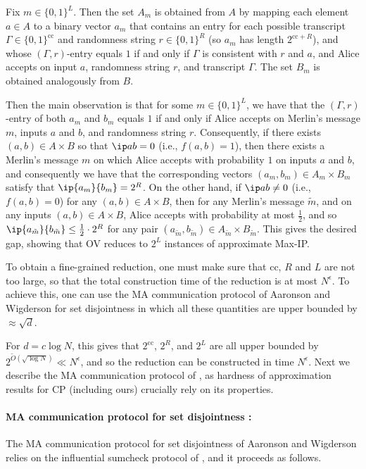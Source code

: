 \documentclass[11pt]{article}
\theoremstyle{plain}
\theoremstyle{remark}
\newcommand{\cc}{\mathrm{cc}}
\begin{document}
Fix $m \in \{0,1\}^L$. Then the set $A_m$ is obtained from $A$ by mapping each element $a \in A$  to a binary vector $a_m$ that contains an entry for each possible transcript $\Gamma \in \{0,1\}^{\cc}$ and randomness string $r \in \{0,1\}^R$ (so $a_m$ has length $2^{\cc+R}$), and whose $(\Gamma, r)$-entry equals $1$ if and only if $\Gamma$ is consistent with $r$ and $a$, and Alice accepts on input $a$, randomness string $r$, and transcript $\Gamma$.
The set $B_m$ is obtained analogously from $B$. 

Then the main observation is that for some $m \in \{0,1\}^L$, we have that the $(\Gamma,r)$-entry of both $a_m$ and $b_m$ equals $1$ if and only if Alice accepts on Merlin's message $m$, inputs $a$ and $b$, and randomness string $r$. Consequently, if there exists $(a,b) \in A \times B$ so that $\ip a b =0$ (i.e., $f(a,b)=1$), then there exists a Merlin's message $m$ on which Alice accepts with probability $1$ on inputs $a$ and $b$, and consequently we have that the corresponding vectors
$(a_m,b_m) \in A_m \times B_m$ satisfy that $\ip {a_m} {b_m} = 2^R$. 
On the other hand, if 
$\ip a b \neq 0$ (i.e., $f(a,b) =0$) for any $(a,b) \in A \times B$, then for any Merlin's message $\tilde m$, and on any inputs $(a,b) \in A \times B$, Alice accepts with probability at most $\frac 1 2$, and so $\ip {a_{\tilde m}} {b_{\tilde m}} \leq \frac 1 2 \cdot 2^R$ for any pair
$(a_{\tilde m},b_{\tilde m}) \in A_{\tilde m} \times B_{\tilde m}$. This gives the desired gap, showing that OV reduces to $2^L$ instances of approximate Max-IP. 

To obtain a fine-grained reduction, one must make sure that $\cc$, $R$ and $L$ are not too large,
so that the total construction time of the reduction is at most $N^{\epsilon}$. To achieve this, one can use the MA communication protocol of Aaronson and Wigderson \cite{AW09} for set disjointness in which all these quantities are upper bounded by $\approx \sqrt{d}$. 

For $d = c \log N$, this gives that $2^\cc$, $2^R$, and $2^L$ are all upper bounded by $2^{\tilde O(\sqrt{ \log N})} \ll N^{\epsilon}$, and so the reduction can be constructed in time  $N^{\epsilon}$. 
Next we describe the MA communication protocol of \cite{AW09}, as hardness of approximation results for CP (including ours) crucially rely on its properties.

\paragraph{MA communication protocol for set disjointness \cite{AW09}:} The MA communication protocol for set disjointness of Aaronson and Wigderson \cite{AW09} relies on the influential sumcheck protocol of \cite{LFKN92}, and it proceeds as follows.
\end{document}
